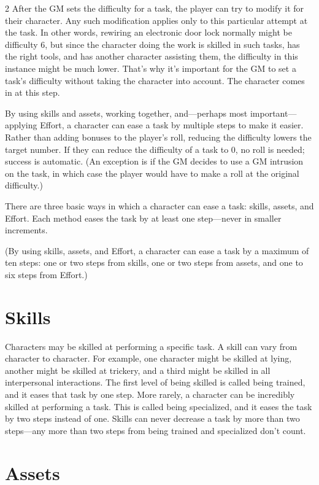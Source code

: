 \begin{multicols}{2}
After the GM sets the difficulty for a task, the player can try to modify it for their character. Any such modification applies only to this particular attempt at the task. In other words, rewiring an electronic door lock normally might be difficulty 6, but since the character doing the work is skilled in such tasks, has the right tools, and has another character assisting them, the difficulty in this instance might be much lower. That’s why it’s important for the GM to set a task’s difficulty without taking the character into account. The character comes in at this step.

By using skills and assets, working together, and—perhaps most important—applying Effort, a character can ease a task by multiple steps to make it easier. Rather than adding bonuses to the player’s roll, reducing the difficulty lowers the target number. If they can reduce the difficulty of a task to 0, no roll is needed; success is automatic. (An exception is if the GM decides to use a GM intrusion on the task, in which case the player would have to make a roll at the original difficulty.)

There are three basic ways in which a character can ease a task: skills, assets, and Effort. Each method eases the task by at least one step—never in smaller increments.

(By using skills, assets, and Effort, a character can ease a task by a maximum of ten steps: one or two steps from skills, one or two steps from assets, and one to six steps from Effort.)

\section{Skills}

Characters may be skilled at performing a specific task. A skill can vary from character to character. For example, one character might be skilled at lying, another might be skilled at trickery, and a third might be skilled in all interpersonal interactions. The first level of being skilled is called being trained, and it eases that task by one step. More rarely, a character can be incredibly skilled at performing a task. This is called being specialized, and it eases the task by two steps instead of one. Skills can never decrease a task by more than two steps—any more than two steps from being trained and specialized don’t count.

\section{Assets}


\end{multicols}
